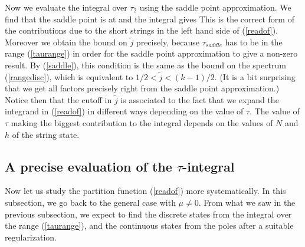 Now we evaluate the integral over $\tau_2$ using the saddle point
approximation.  We find that the saddle point is at
and the integral gives
This is the correct form of the contributions due to
the short strings in the left hand side of (\ref{readof}).  
Moreover we obtain the bound on $\tilde{j}$ precisely,
because $\tau_{saddle}$ has
to be in the range (\ref{taurange}) in order for the
saddle point approximation to give a non-zero result. 
By (\ref{saddle}), this condition is the same as
the bound on the spectrum (\ref{rangedisc}), which
is equivalent to  $1/2 < \tilde{j} < (k-1)/2$.
(It is a bit surprising that we get all factors precisely right from
the saddle point approximation.)
%
Notice then that the cutoff in $\tilde{j}$ 
is associated to the fact that 
we expand the integrand in (\ref{readof}) in different ways depending 
on the value of $\tau$. The value of $\tau $ making 
the biggest contribution 
to the integral depends on the values of $N$ and $h$ of the string state. 


\subsection{A precise evaluation of the $\tau$-integral}

Now let us study the partition function (\ref{readof}) more 
systematically.  
In this subsection, we go back to the general case with 
$\mu\neq 0$. From what we saw in the previous subsection, 
we expect to find the discrete
states from the integral over the range (\ref{taurange}),
and the continuous states from the poles
after a suitable regularization. 
 
